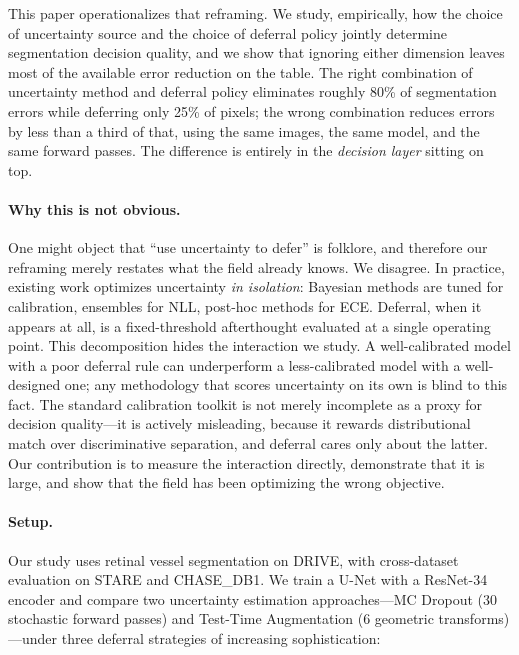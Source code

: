 This paper operationalizes that reframing. We study, empirically, how the
choice of uncertainty source and the choice of deferral policy jointly
determine segmentation decision quality, and we show that ignoring either
dimension leaves most of the available error reduction on the table. The
right combination of uncertainty method and deferral policy eliminates
roughly 80\% of segmentation errors while deferring only 25\% of pixels;
the wrong combination reduces errors by less than a third of that, using
the same images, the same model, and the same forward passes. The
difference is entirely in the \emph{decision layer} sitting on top.

\paragraph{Why this is not obvious.} One might object that ``use
uncertainty to defer'' is folklore, and therefore our reframing merely
restates what the field already knows. We disagree. In practice, existing
work optimizes uncertainty \emph{in isolation}: Bayesian methods are tuned
for calibration, ensembles for NLL, post-hoc methods for ECE. Deferral,
when it appears at all, is a fixed-threshold afterthought evaluated at a
single operating point. This decomposition hides the interaction we study.
A well-calibrated model with a poor deferral rule can underperform a
less-calibrated model with a well-designed one; any methodology that
scores uncertainty on its own is blind to this fact. The standard
calibration toolkit is not merely incomplete as a proxy for decision
quality---it is actively misleading, because it rewards distributional
match over discriminative separation, and deferral cares only about the
latter. Our contribution is to measure the interaction directly,
demonstrate that it is large, and show that the field has been optimizing
the wrong objective.

\paragraph{Setup.} Our study uses retinal vessel segmentation on DRIVE,
with cross-dataset evaluation on STARE and CHASE\_DB1. We train a U-Net
with a ResNet-34 encoder and compare two uncertainty estimation
approaches---MC Dropout (30 stochastic forward passes) and Test-Time
Augmentation (6 geometric transforms)---under three deferral strategies
of increasing sophistication:

